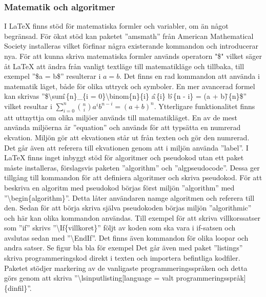 \subsubsection{Matematik och algoritmer}
I {\LaTeX} finns stöd för matematiska formler och variabler, om än något begränsad. För ökat stöd kan paketet ''amsmath'' från American Mathematical Society installeras vilket förfinar några existerande kommandon och introducerar nya. För att kunna skriva matematiska formler används operatorn "\$" \hspace{0.2mm} vilket säger åt {\LaTeX} att ändra från vanligt textläge till matematikläge och tillbaka, till exempel ''\$a = b\$'' resulterar i $a = b$. Det finns en rad kommandon att använda i matematik läget, både för olika uttryck och symboler. En mer avancerad formel kan skrivas ''\$\textbackslash sum\^ \,\{n\}\_\{i = 0\}\textbackslash binom\{n\}\{i\} a\^ \,\{i\} b\^ \,\{n - i\} = (a + b)\^ \,\{n\}\$'' vilket resultar i $\sum^{n}_{i=0}\binom{n}{i}a^{i}b^{n-i} = (a + b)^{n}$. 
\newline
\newline
Ytterligare funktionalitet finns att uttnyttja om olika miljöer används till matematikläget. En av de mest använda miljöerna är ''equation'' och används för att typsätta en numrerad ekvation. Miljön gör att ekvationen står ut från texten och gör den numrerad. Det går även att referera till ekvationen genom att i miljön använda ''label''.    
\newline
\newline
I {\LaTeX} finns inget inbyggt stöd för algoritmer och pseudokod utan ett paket måste installeras, förslagsvis paketen ''algorithm'' och ''algpseudocode''. Dessa ger tillgång till kommandon för att definiera algoritmer och skriva pseudokod. För att beskriva en algoritm med pseudokod börjas först miljön ''algorithm'' med ''\textbackslash begin\{algorithm\}''. Detta låter användaren namge algoritmen och referera till den. Sedan för att börja skriva själva pseudokoden börjas miljön ''algorithmic'' och här kan olika kommandon användas. Till exempel för att skriva villkorssatser som ''if'' skrivs ''\textbackslash If\{villkoret\}'' följt av koden som ska vara i if-satsen och avslutas sedan med ''\textbackslash EndIf''. Det finns även kommandon för olika loopar och andra satser. Se figur bla bla för exempel 
\newline
\newline
Det går även med paket ''listings'' skriva programmeringskod direkt i texten och importera befintliga kodfiler. Paketet stödjer markering av de vanligaste programmeringsspråken och detta görs genom att skriva ''\textbackslash lsinputlisting[language = valt programmeringsspråk]\{dinfil\}''.  